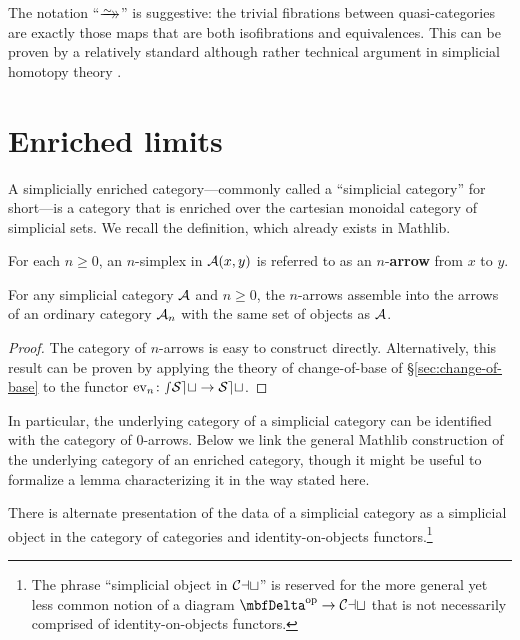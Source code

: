   The notation ``$\trvfib$'' is suggestive: the trivial fibrations between quasi-cat\-e\-go\-ries are exactly those maps that are both isofibrations and equivalences. This can be proven by a relatively standard although rather technical argument in simplicial homotopy theory \cite[D.5.6]{RiehlVerity:2022eo}.

\section{Enriched limits}\label{sec:enriched-limits}

A simplicially enriched category---commonly called a ``simplicial category'' for short---is a category that is enriched over the cartesian monoidal category of simplicial sets. We recall the definition, which already exists in Mathlib.


\begin{definition}\label{defn:n-arrow}
For each $n \geq 0$, an $n$-simplex in ${\mathord{\mathcal{A}}}(x,y)$ is referred to as an $n$-\textbf{arrow} from $x$ to $y$.
\end{definition}

\begin{lemma}\label{lem:cat-of-n-arrows} For any simplicial category ${\mathord{\mathcal{A}}}$ and $n \geq 0$,
the $n$-arrows assemble into the arrows of an ordinary category ${\mathord{\mathcal{A}}}_n$ with the same set of objects as ${\mathord{\mathcal{A}}}$.
\end{lemma}
\begin{proof}
The category of $n$-arrows is easy to construct directly. Alternatively, this result can be proven by applying the theory of change-of-base of \S\ref{sec:change-of-base} to the functor $\textup{ev}_n \colon {\mathord{\mathcal{sSet}}} \to {\mathord{\mathcal{Set}}}$.
\end{proof}

In particular, the underlying category of a simplicial category can be identified with the category of $0$-arrows. Below we link the general Mathlib construction of the underlying category of an enriched category, though it might be useful to formalize a lemma characterizing it in the way stated here.


There is alternate presentation of the data of a simplicial category as a simplicial object in the category of categories and identity-on-objects functors.\footnote{The phrase ``simplicial object in ${\mathord{\mathcal{Cat}}}$'' is reserved for the more general yet less common notion of a diagram $\Del\op\to\Cat$ that is not necessarily comprised of identity-on-objects functors.}


